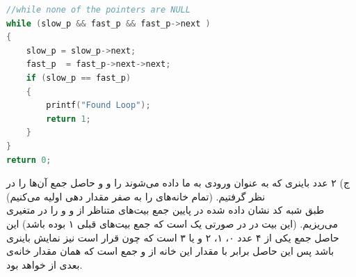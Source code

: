 \documentclass{article}
\begin{document}
\begin{enumerate}
\begin{enumerate}
\begin{latin}
\begin{flushright}
\begin{lstlisting}[language=C++]
//while none of the pointers are NULL  
while (slow_p && fast_p && fast_p->next )
{
    slow_p = slow_p->next;
    fast_p  = fast_p->next->next;
    if (slow_p == fast_p)
    {
        printf("Found Loop");
        return 1;
    }
}
return 0;
\end{lstlisting}
\end{flushright}								
\end{latin}
ج) ۲ عدد باینری که به عنوان ورودی به ما داده‌ می‌شوند را  و  و حاصل جمع آن‌ها را  در نظر گرفتیم. (تمام خانه‌های  را به صفر مقدار دهی اولیه می‌کنیم)\\ 
طبق شبه کد نشان داده شده در پایین جمع بیت‌های متناظر از  و  و  را در متغیری می‌ریزیم. (این بیت در  در صورتی یک است که  جمع بیت‌‌های قبلی ۱ بوده باشد) این حاصل جمع یکی از ۴ عدد ۰، ۱، ۲‌ و یا ۳ است که چون قرار است  نیز نمایش باینری باشد پس این حاصل برابر با مقدار این خانه از  و  جمع است که همان مقدار خانه‌ی بعدی از  خواهد بود. 
\begin{latin}
\begin{flushright}				
\begin{lstlisting}[language=C++]


\end{lstlisting}
\end{flushright}
\end{latin}
\end{enumerate}
\end{enumerate}
\end{document}
